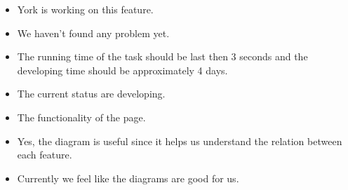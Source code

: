 \documentclass[a4paper]{article}
\begin{document}
\newline
\begin{itemize}
	\item York is working on this feature. 
	\item We haven't found any problem yet.
    \item The running time of the task should be last then 3 seconds and the developing time should be approximately 4 days.
    \item The current status are developing.
  \item The functionality of the page.
  \item Yes, the diagram is useful since it helps us understand the relation between each feature.
  \item Currently we feel like the diagrams are good for us.
\end{itemize}
\end{document}
